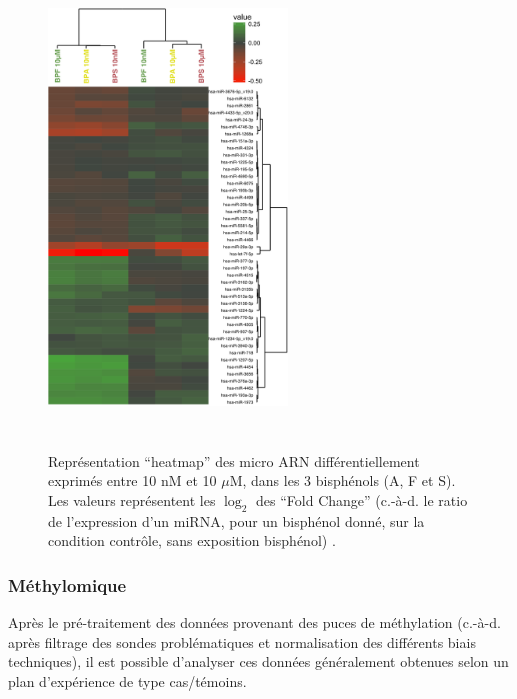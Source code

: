 \documentclass[11pt,a4paper,notrimn]{krantz}
\theoremstyle{definition}
\theoremstyle{definition}
\theoremstyle{remark}
\begin{document}
\begin{figure}[!htb]

{\centering \includegraphics[width=2.5in,height=5in]{FiguresTables/heatmap} 

}

\caption{Représentation ``heatmap'' des micro ARN
différentiellement exprimés entre 10 nM et 10 \(\mu\)M, dans les 3
bisphénols (A, F et S). Les valeurs représentent les \(\log_2\) des
``Fold Change'' (c.-à-d. le ratio de l'expression d'un miRNA, pour un
bisphénol donné, sur la condition contrôle, sans exposition bisphénol)
\citep{verbanck_low-dose_2017}.}\label{fig:heatmap}
\end{figure}

\subsubsection{Méthylomique}\label{methylomique}

Après le pré-traitement des données provenant des puces de méthylation
(c.-à-d. après filtrage des sondes problématiques et normalisation des
différents biais techniques), il est possible d'analyser ces données
généralement obtenues selon un plan d'expérience de type cas/témoins.
\end{document}
